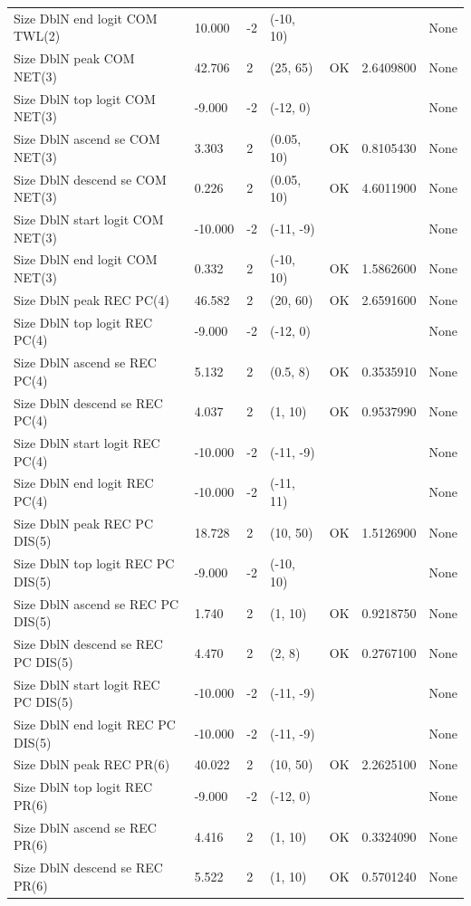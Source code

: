 \documentclass[
  english,
  a4paper,
]{article}
\begin{document}
\begin{landscape}
\begin{longtable}[t]{>{\raggedright\arraybackslash}p{8.5cm}lllll>{\raggedright\arraybackslash}p{4cm}}
Size DblN end logit COM TWL(2) & 10.000 & -2 & (-10, 10) &  &  & None\\
Size DblN peak COM NET(3) & 42.706 & 2 & (25, 65) & OK & 2.6409800 & None\\
Size DblN top logit COM NET(3) & -9.000 & -2 & (-12, 0) &  &  & None\\
Size DblN ascend se COM NET(3) & 3.303 & 2 & (0.05, 10) & OK & 0.8105430 & None\\
Size DblN descend se COM NET(3) & 0.226 & 2 & (0.05, 10) & OK & 4.6011900 & None\\
Size DblN start logit COM NET(3) & -10.000 & -2 & (-11, -9) &  &  & None\\
Size DblN end logit COM NET(3) & 0.332 & 2 & (-10, 10) & OK & 1.5862600 & None\\
Size DblN peak REC PC(4) & 46.582 & 2 & (20, 60) & OK & 2.6591600 & None\\
Size DblN top logit REC PC(4) & -9.000 & -2 & (-12, 0) &  &  & None\\
Size DblN ascend se REC PC(4) & 5.132 & 2 & (0.5, 8) & OK & 0.3535910 & None\\
Size DblN descend se REC PC(4) & 4.037 & 2 & (1, 10) & OK & 0.9537990 & None\\
Size DblN start logit REC PC(4) & -10.000 & -2 & (-11, -9) &  &  & None\\
Size DblN end logit REC PC(4) & -10.000 & -2 & (-11, 11) &  &  & None\\
Size DblN peak REC PC DIS(5) & 18.728 & 2 & (10, 50) & OK & 1.5126900 & None\\
Size DblN top logit REC PC DIS(5) & -9.000 & -2 & (-10, 10) &  &  & None\\
Size DblN ascend se REC PC DIS(5) & 1.740 & 2 & (1, 10) & OK & 0.9218750 & None\\
Size DblN descend se REC PC DIS(5) & 4.470 & 2 & (2, 8) & OK & 0.2767100 & None\\
Size DblN start logit REC PC DIS(5) & -10.000 & -2 & (-11, -9) &  &  & None\\
Size DblN end logit REC PC DIS(5) & -10.000 & -2 & (-11, -9) &  &  & None\\
Size DblN peak REC PR(6) & 40.022 & 2 & (10, 50) & OK & 2.2625100 & None\\
Size DblN top logit REC PR(6) & -9.000 & -2 & (-12, 0) &  &  & None\\
Size DblN ascend se REC PR(6) & 4.416 & 2 & (1, 10) & OK & 0.3324090 & None\\
Size DblN descend se REC PR(6) & 5.522 & 2 & (1, 10) & OK & 0.5701240 & None\\

\end{longtable}
\end{landscape}
\end{document}
